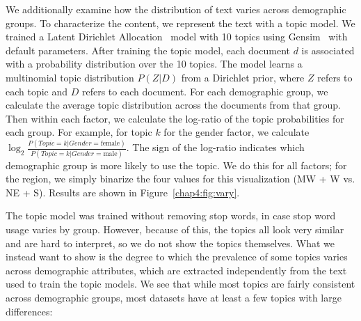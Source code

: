 We additionally examine how the distribution of text varies across demographic groups. To characterize the content, we represent the text with a topic model.
We trained a Latent Dirichlet Allocation~\cite{blei2003latent} model with 10 topics using Gensim~\cite{rehurek2010software} with default parameters.
After training the topic model, each document $d$ is associated with a probability distribution over the 10 topics. 
The model learns a multinomial topic distribution $P(Z|D)$ from a Dirichlet prior, where $Z$ refers to each topic and $D$ refers to each document.
For each demographic group, we calculate the average topic distribution across the documents from that group.
Then within each factor, we calculate the log-ratio of the topic probabilities for each group.
For example, for topic $k$ for the gender factor,
we calculate $\log_2 \frac{P(Topic=k|Gender=\textrm{female})}{P(Topic=k|Gender=\textrm{male})}$.
The sign of the log-ratio indicates which demographic group is more likely to use the topic.
We do this for all factors;
for the region, we simply binarize the four values for this visualization (MW + W vs. NE + S).
Results are shown in Figure~\ref{chap4:fig:vary}.

The topic model was trained without removing stop words, in case stop word usage varies by group.
However, because of this, the topics all look very similar and are hard to interpret, so we do not show the topics themselves.
What we instead want to show is the degree to which the prevalence of some topics varies across demographic attributes, which are extracted independently from the text used to train the topic models.
We see that while most topics are fairly consistent across demographic groups, most datasets have at least a few topics with large differences:

